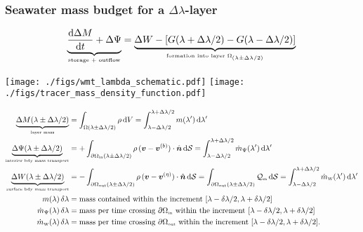 \documentclass[10pt]{beamer}
\begin{document}
\begin{frame}
  \frametitle{Seawater mass budget for a $\Delta \lambda$-layer}
\tiny 

\begin{exampleblock}{}

\begin{equation*}
 \underbrace{ \frac{\mathrm{d} \Delta M}{\mathrm{d}  t} + \Delta \Psi}_{\mbox{\tiny storage + outflow}}
 = \underbrace{ \Delta W 
 -[ G(\lambda + \Delta \lambda/2) - G(\lambda - \Delta \lambda/2) ]
  }_{\mbox{\tiny formation into layer $\Omega_{(\lambda \pm \Delta \lambda/2)}$}}
\end{equation*}

\end{exampleblock}
\begin{center}
{\texttt{[image: ./figs/wmt\_lambda\_schematic.pdf]}}
\hspace{.5cm}
{\texttt{[image: ./figs/tracer\_mass\_density\_function.pdf]}}
 \end{center}

\tiny 

\begin{align*}
 \underbrace{\Delta M(\lambda \pm \Delta \lambda/2)}_{\mbox{\tiny layer mass}}
 &= \int_{\Omega(\lambda \pm \Delta \lambda/2)} \rho \, \mathrm{d}V 
   =  \int_{\lambda - \Delta \lambda/2}^{\lambda + \Delta \lambda/2}  m(\lambda') \, \mathrm{d}\lambda'
\\
 \underbrace{\Delta \Psi(\lambda \pm \Delta \lambda/2)}_{\mbox{\tiny interior bdy mass transport}}
 &= +\int_{\partial \Omega_{\mbox{\tiny in}}(\lambda \pm \Delta \lambda/2)} \rho \,
 ({\bm v} - {\bm v}^{(b)}) \cdot \hat{\bm n} \, \mathrm{d}\mathcal{S}
= \int_{\lambda - \Delta \lambda/2}^{\lambda + \Delta \lambda/2} 
    \dot{m}_{\Psi}(\lambda') \, \mathrm{d}\lambda'
\\
 \underbrace{\Delta W(\lambda \pm \Delta \lambda/2)}_{\mbox{\tiny surface bdy mass transport}}
&=
-\int_{\partial \Omega_{\mbox{\tiny out}}(\lambda \pm \Delta \lambda/2)} \rho \,
 ({\bm v} - {\bm v}^{(\eta)}) \cdot \hat{\bm n} \, \mathrm{d}\mathcal{S}
 =
 \int_{\partial \Omega_{\mbox{\tiny out}}(\lambda \pm \Delta \lambda/2)} 
 \mathcal{Q}_{\mbox{\tiny m}} \, \mathrm{d}\mathcal{S}
= \int_{\lambda - \Delta \lambda/2}^{\lambda + \Delta \lambda/2} 
    \dot{m}_{\mbox{\tiny W}}(\lambda') \, \mathrm{d}\lambda'
\\
 m (\lambda) \, \delta \lambda 
&= \mbox{mass contained within the increment $[\lambda-\delta \lambda/2, \lambda+\delta \lambda/2]$}
\\
\dot{m}_{\Psi}(\lambda) \, \delta \lambda 
&= \mbox{mass per time crossing  
$\partial \Omega_{\mbox{\tiny in}}$ 
 within the increment $[\lambda-\delta \lambda/2, \lambda+\delta \lambda/2]$}
\\
 \dot{m}_{\mbox{\tiny W}}(\lambda)   \, \delta \lambda 
&= \mbox{mass per time crossing $\partial \Omega_{\mbox{\tiny out}}$ 
 within the increment $[\lambda-\delta \lambda/2, \lambda+\delta \lambda/2]$.}
\end{align*}   

\end{frame}
\end{document}

